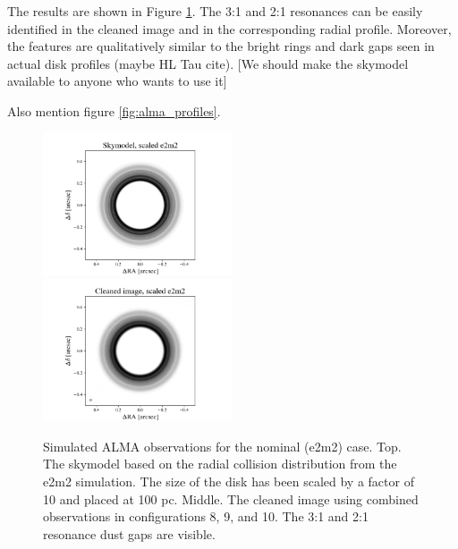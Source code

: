 \documentclass[twocolumn]{aastex63}
\begin{document}
The results are shown in Figure \ref{fig:alma_sim_obs}.  The 3:1 and 2:1 resonances can be easily identified in the cleaned image and in the corresponding radial profile.  Moreover, the features are qualitatively similar to the bright rings and dark gaps seen in actual disk profiles (maybe HL Tau cite). [We should make the skymodel available to anyone who wants to use it]

Also mention figure \ref{fig:alma_profiles}.

\begin{figure}
\begin{center}
    \includegraphics[width=0.5\textwidth]{alma/skymodel_e2m2.png}
    \includegraphics[width=0.5\textwidth]{alma/xy_e2m2.png}
    \caption{Simulated ALMA observations for the nominal (e2m2) case.  Top. The skymodel based on the radial collision distribution from the e2m2 simulation. The size of the disk has been scaled by a factor of 10 and placed at 100 pc. Middle. The cleaned image using combined observations in configurations 8, 9, and 10. The 3:1 and 2:1 resonance dust gaps are visible. \label{fig:alma_sim_obs}}
\end{center}
\end{figure}
\end{document}

